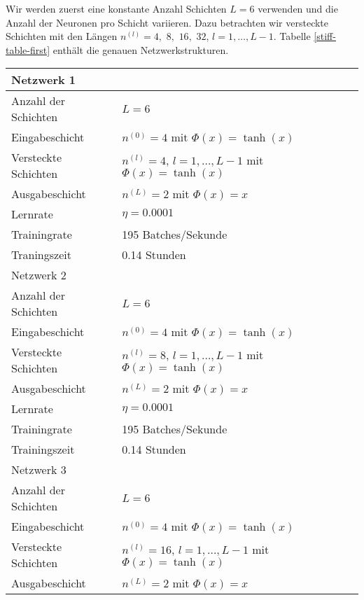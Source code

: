 Wir werden zuerst eine konstante Anzahl Schichten $L=6$ verwenden und die Anzahl der Neuronen pro Schicht variieren.
Dazu betrachten wir versteckte Schichten mit den Längen
$n^{(l)} = 4,$ $8,$ $16,$ $32$, $l = 1, \dots, L-1$. Tabelle \ref{stiff-table-first} enthält die genauen
Netzwerkstrukturen.
\begin{table}
       \renewcommand{\arraystretch}{1.0}
       \centering
       \begin{tabular}{ l | l }
              \hline
              Netzwerk 1 & \\
              \hline
              Anzahl der Schichten & $L=6$ \\
              Eingabeschicht & $n^{(0)}=4$ mit $\Phi(x)=\tanh(x)$ \\
              Versteckte Schichten & $n^{(l)}=4$, $l = 1, \dots, L-1$ mit $\Phi(x)=\tanh(x)$ \\
              Ausgabeschicht & $n^{(L)}=2$ mit $\Phi(x)=x$ \\
              Lernrate & $\eta=0.0001$ \\
              Trainingrate & 195 Batches/Sekunde \\
              Traningszeit & 0.14 Stunden \\
              \hline
              Netzwerk 2 & \\
              \hline
              Anzahl der Schichten & $L=6$ \\
              Eingabeschicht & $n^{(0)}=4$ mit $\Phi(x)=\tanh(x)$ \\
              Versteckte Schichten & $n^{(l)}=8$, $l = 1, \dots, L-1$ mit $\Phi(x)=\tanh(x)$ \\
              Ausgabeschicht & $n^{(L)}=2$ mit $\Phi(x)=x$ \\
              Lernrate & $\eta=0.0001$ \\
              Trainingrate & 195 Batches/Sekunde \\
              Trainingszeit & 0.14 Stunden \\
              \hline
              Netzwerk 3 & \\
              \hline
              Anzahl der Schichten & $L=6$ \\
              Eingabeschicht & $n^{(0)}=4$ mit $\Phi(x)=\tanh(x)$ \\
              Versteckte Schichten & $n^{(l)}=16$, $l = 1, \dots, L-1$ mit $\Phi(x)=\tanh(x)$ \\
              Ausgabeschicht & $n^{(L)}=2$ mit $\Phi(x)=x$ \\

\end{tabular}
\end{table}
